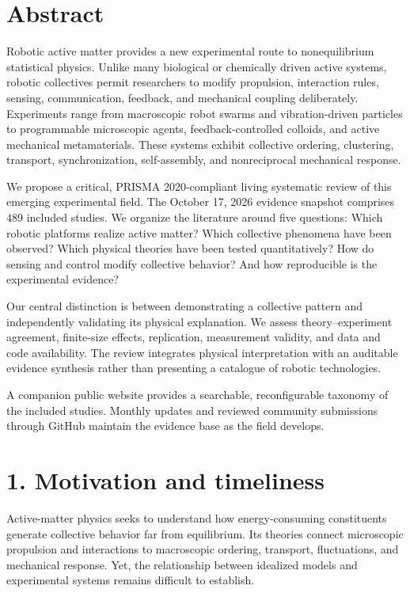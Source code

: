 \section*{Abstract}

Robotic active matter provides a new experimental route to
nonequilibrium statistical physics. Unlike many biological
or chemically driven active systems, robotic collectives
permit researchers to modify propulsion, interaction
rules, sensing, communication, feedback, and mechanical
coupling deliberately. Experiments range from macroscopic
robot swarms and vibration-driven particles to programmable
microscopic agents, feedback-controlled colloids, and
active mechanical metamaterials. These systems exhibit
collective ordering, clustering, transport, synchronization,
self-assembly, and nonreciprocal mechanical response.

We propose a critical, PRISMA 2020-compliant living
systematic review of this emerging experimental field.
The October 17, 2026 evidence snapshot comprises
489 included studies. We organize the literature around
five questions: Which robotic platforms realize active
matter? Which collective phenomena have been observed?
Which physical theories have been tested quantitatively?
How do sensing and control modify collective behavior?
And how reproducible is the experimental evidence?

Our central distinction is between demonstrating a
collective pattern and independently validating its
physical explanation. We assess theory--experiment
agreement, finite-size effects, replication, measurement
validity, and data and code availability. The review
integrates physical interpretation with an auditable
evidence synthesis rather than presenting a catalogue
of robotic technologies.

A companion public website provides a searchable,
reconfigurable taxonomy of the included studies.
Monthly updates and reviewed community submissions
through GitHub maintain the evidence base as the
field develops.

\section*{1. Motivation and timeliness}

Active-matter physics seeks to understand how
energy-consuming constituents generate collective
behavior far from equilibrium. Its theories connect
microscopic propulsion and interactions to macroscopic
ordering, transport, fluctuations, and mechanical
response. Yet, the relationship between idealized
models and experimental systems remains difficult
to establish.

